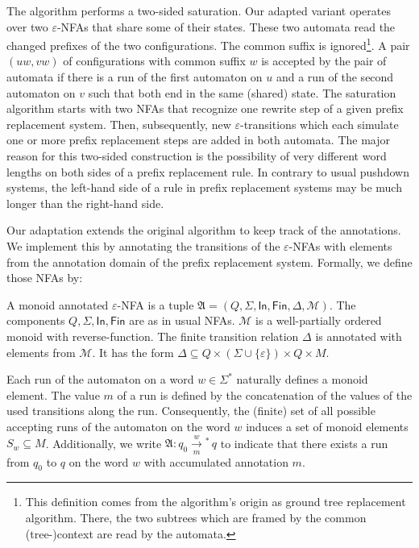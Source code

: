 \documentclass{LMCS}
\newcommand{\apathS}[2][]{\xrightarrow[#1]{#2}\!\!{}^*\,}
\newcommand{\eps}{\varepsilon}
\newcommand{\automatonA}{\mathfrak A}
\newcommand{\In}{\mathsf{In}}
\newcommand{\Fin}{\mathsf{Fin}}
\newcommand{\annotationMonoidM}{\mathcal M}
\begin{document}
The algorithm performs a two-sided saturation. Our adapted variant operates
over two $\eps$-NFAs that share some of their states. These two automata read
the changed prefixes of the two configurations. The common suffix is
ignored\footnote{This definition comes from the algorithm's origin as ground
tree replacement algorithm. There, the two subtrees which are framed by the
common (tree-)context are read by the automata.}. A pair $(uw,vw)$ of
configurations with common suffix $w$ is accepted by the pair of automata if
there is a run of the first automaton on $u$ and a run of the second automaton
on $v$ such that both end in the same (shared) state. The saturation algorithm
starts with two NFAs that recognize one rewrite step of a given prefix
replacement system. Then, subsequently, new $\eps$-transitions which each
simulate one or more prefix replacement steps are added in both automata. The
major reason for this two-sided construction is the possibility of very
different word lengths on both sides of a prefix replacement rule. In contrary
to usual pushdown systems, the left-hand side of a rule in prefix replacement
systems may be much longer than the right-hand side. 

Our adaptation extends the original algorithm to keep track of the annotations. We
implement this by annotating the transitions of the $\eps$-NFAs with elements
from the annotation domain of the prefix replacement system. Formally, we
define those NFAs by:
\begin{defi}[Monoid annotated $\eps$-NFA]
A monoid annotated $\eps$-NFA is a tuple $\automatonA =
(Q,\Sigma,\In,\Fin,\Delta,\annotationMonoidM)$. The components
$Q,\Sigma,\In,\Fin$ are as in usual NFAs. $\annotationMonoidM$ is a
well-partially ordered monoid with reverse-function. The finite transition
relation $\Delta$ is annotated with elements from $\annotationMonoidM$. It 
has the form $\Delta \subseteq Q \times (\Sigma \cup \{\eps\}) \times Q \times
M$. 
  
Each run of the automaton on a word $w \in \Sigma^*$ naturally defines a
monoid element. The value $m$ of a run is defined by the concatenation of the
values of the used transitions along the run. Consequently, the (finite) set of all possible
accepting runs of the automaton on the word $w$ induces a set of monoid elements
$S_w \subseteq M$. Additionally, we write $\automatonA: q_0 \apathS[m]{w} q$ to
indicate that there exists a run from $q_0$ to $q$ on the word $w$ with
accumulated annotation $m$.
\end{defi}
\end{document}
